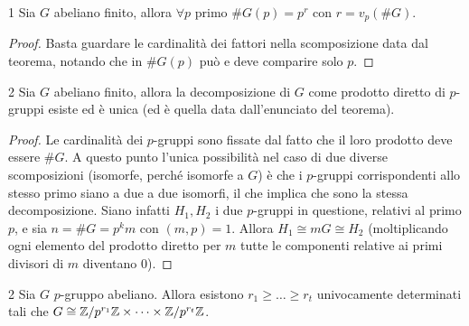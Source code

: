 \begin{corollary}{1}
    Sia $G$ abeliano finito, allora $\forall p$ primo $\#G(p) = p^r$ con $r = v_p(\#G)$.
\end{corollary}
\begin{proof}
    Basta guardare le cardinalità dei fattori nella scomposizione data dal teorema, notando che in $\#G(p)$ può e deve comparire solo $p$.
\end{proof}
\begin{corollary}{2}
    Sia $G$ abeliano finito, allora la decomposizione di $G$ come prodotto diretto di $p$-gruppi esiste ed è unica (ed è quella data dall'enunciato del teorema). 
\end{corollary}
\begin{proof}
    Le cardinalità dei $p$-gruppi sono fissate dal fatto che il loro prodotto deve essere $\#G$. A questo punto l'unica possibilità nel caso di due diverse scomposizioni (isomorfe, perché isomorfe a $G$) è che i $p$-gruppi corrispondenti allo stesso primo siano a due a due isomorfi, il che implica che sono la stessa decomposizione. Siano infatti $H_1, H_2$ i due $p$-gruppi in questione, relativi al primo $p$, e sia $n = \#G = p^km$ con $(m,p)=1$. Allora $H_1 \cong mG \cong H_2$ (moltiplicando ogni elemento del prodotto diretto per $m$ tutte le componenti relative ai primi divisori di $m$ diventano 0).
\end{proof}
\begin{theorem}{2}
    Sia $G$ $p$-gruppo abeliano. Allora esistono $r_1 \geq \dots \geq r_t$ univocamente determinati tali che $G \cong \mathbb{Z}/p^{r_1}\mathbb{Z} \times \dots \times \mathbb{Z}/p^{r_t}\mathbb{Z}$.
\end{theorem}
